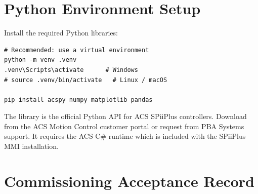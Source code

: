 \section{Python Environment Setup}
\label{app:python-env}

Install the required Python libraries:

\begin{pythoncode}
\begin{lstlisting}
# Recommended: use a virtual environment
python -m venv .venv
.venv\Scripts\activate      # Windows
# source .venv/bin/activate   # Linux / macOS

pip install acspy numpy matplotlib pandas
\end{lstlisting}
\end{pythoncode}

\begin{notebox}
  The  library is the official Python API for ACS SPiiPlus
  controllers.  Download from the ACS Motion Control customer portal
  or request from PBA Systems support.  It requires the ACS C\# runtime
  which is included with the SPiiPlus MMI installation.
\end{notebox}


\section{Commissioning Acceptance Record}
\label{app:acceptance}


